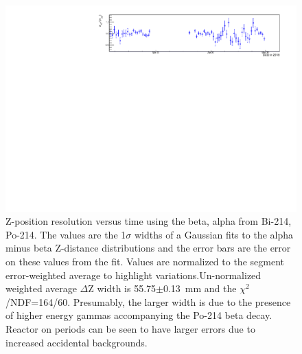 \begin{figure}[!h]
\centering
\includegraphics[width=1.05\textwidth]{figures/PubBiPo214ZresvsT.pdf}
\caption{\label{fig:ZresvsT214}Z-position resolution versus time using the beta, alpha from Bi-214, Po-214. The values are the 1$\sigma$ widths of a Gaussian fits to the alpha minus beta Z-distance distributions and the error bars are the error on these values from the fit. Values are normalized to the segment error-weighted average to highlight variations.Un-normalized weighted average $\Delta$Z width is 55.75$\pm$0.13~mm and the $\chi^2$/NDF=164/60. Presumably, the larger width is due to the presence of higher energy gammas accompanying the Po-214 beta decay. Reactor on periods can be seen to have larger errors due to increased accidental backgrounds.}
\end{figure}
\newpage
